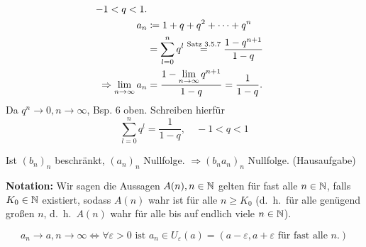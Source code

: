 \documentclass[../ana1.tex]{subfiles}
\begin{document}
\begin{bsp}
	\begin{align*}
		-1<q<1.\\
		a_n &\coloneqq 1 + q + q^2 + \cdots + q^n\\
		&= \sum_{l=0}^{n} q^l \overset{\text{Satz 3.5.7}}{=} \frac{1-q^{n+1}}{1-q}\\
		\Rightarrow \lim\limits_{n\rightarrow\infty} a_n &= \frac{1- \lim\limits_{n\rightarrow\infty} q^{n+1}}{1-q} = \frac{1}{1-q}.
	\end{align*}
	Da \(q^n \rightarrow 0, n\rightarrow\infty \), Bsp. 6 oben.
	Schreiben hierfür \[ \sum_{l=0}^{n} q^l = \frac{1}{1-q}, \quad -1<q<1 \]
\end{bsp}

\begin{bsp}
	Ist \( {(b_n)}_n \) beschränkt, \( {(a_n)}_n \) Nullfolge. \( \Rightarrow {(b_n a_n)}_n \) Nullfolge. (Hausaufgabe)
\end{bsp}

\textbf{Notation:} Wir sagen die Aussagen \( A(n), n\in\mathbb{N} \) gelten für fast alle \( n\in\mathbb{N} \), falls \( K_0\in\mathbb{N} \) existiert, sodass \(A(n)\) wahr ist für alle \( n\geq K_0 \) (d.\ h.\ für alle genügend großen \( n \), d.\ h.\  \( A(n) \) wahr für alle bis auf endlich viele \(n\in\mathbb{N} \)).

\begin{bsp}
	\[ a_n\rightarrow a,n\rightarrow\infty \Leftrightarrow \forall \varepsilon > 0 \text{ ist } a_n\in U_\varepsilon(a) = (a-\varepsilon, a+\varepsilon \text{ für fast alle } n.)  \]
\end{bsp}
\end{document}

